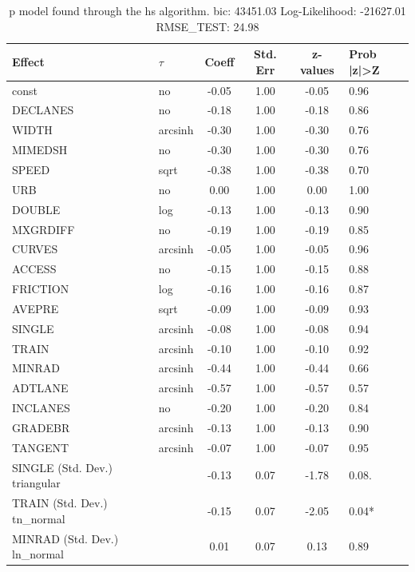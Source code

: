 \begin{table}
	\caption{p model found through the hs algorithm. bic: 43451.03 Log-Likelihood: -21627.01 RMSE_TEST: 24.98}
	\begin{center}
		\begin{tabular}{|l|l|c|c|c|l|}
			\hline
			Effect & $\tau$ & Coeff & Std. Err & z-values & Prob |z|>Z \\
			\hline
			const & no & -0.05 & 1.00 & -0.05 & 0.96 \\
			\hline
			DECLANES & no & -0.18 & 1.00 & -0.18 & 0.86 \\
			\hline
			WIDTH & arcsinh & -0.30 & 1.00 & -0.30 & 0.76 \\
			\hline
			MIMEDSH & no & -0.30 & 1.00 & -0.30 & 0.76 \\
			\hline
			SPEED & sqrt & -0.38 & 1.00 & -0.38 & 0.70 \\
			\hline
			URB & no & 0.00 & 1.00 & 0.00 & 1.00 \\
			\hline
			DOUBLE & log & -0.13 & 1.00 & -0.13 & 0.90 \\
			\hline
			MXGRDIFF & no & -0.19 & 1.00 & -0.19 & 0.85 \\
			\hline
			CURVES & arcsinh & -0.05 & 1.00 & -0.05 & 0.96 \\
			\hline
			ACCESS & no & -0.15 & 1.00 & -0.15 & 0.88 \\
			\hline
			FRICTION & log & -0.16 & 1.00 & -0.16 & 0.87 \\
			\hline
			AVEPRE & sqrt & -0.09 & 1.00 & -0.09 & 0.93 \\
			\hline
			SINGLE & arcsinh & -0.08 & 1.00 & -0.08 & 0.94 \\
			\hline
			TRAIN & arcsinh & -0.10 & 1.00 & -0.10 & 0.92 \\
			\hline
			MINRAD & arcsinh & -0.44 & 1.00 & -0.44 & 0.66 \\
			\hline
			ADTLANE & arcsinh & -0.57 & 1.00 & -0.57 & 0.57 \\
			\hline
			INCLANES & no & -0.20 & 1.00 & -0.20 & 0.84 \\
			\hline
			GRADEBR & arcsinh & -0.13 & 1.00 & -0.13 & 0.90 \\
			\hline
			TANGENT & arcsinh & -0.07 & 1.00 & -0.07 & 0.95 \\
			\hline
			SINGLE (Std. Dev.) triangular &  & -0.13 & 0.07 & -1.78 & 0.08. \\
			\hline
			TRAIN (Std. Dev.) tn_normal &  & -0.15 & 0.07 & -2.05 & 0.04* \\
			\hline
			MINRAD (Std. Dev.) ln_normal &  & 0.01 & 0.07 & 0.13 & 0.89 \\

\end{tabular}
\end{center}
\end{table}
